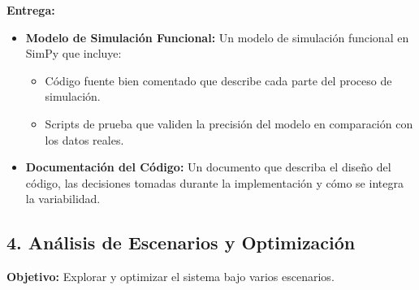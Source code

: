 \documentclass[12pt]{article}
\begin{document}
\textbf{Entrega:}
\begin{itemize}
    \item \textbf{Modelo de Simulación Funcional:} Un modelo de simulación funcional en SimPy que incluye:
    \begin{itemize}
        \item Código fuente bien comentado que describe cada parte del proceso de simulación.
        \item Scripts de prueba que validen la precisión del modelo en comparación con los datos reales.
    \end{itemize}
    \item \textbf{Documentación del Código:} Un documento que describa el diseño del código, las decisiones tomadas durante la implementación y cómo se integra la variabilidad.
\end{itemize}

\subsection*{4. Análisis de Escenarios y Optimización}
\textbf{Objetivo:} Explorar y optimizar el sistema bajo varios escenarios.
\end{document}
